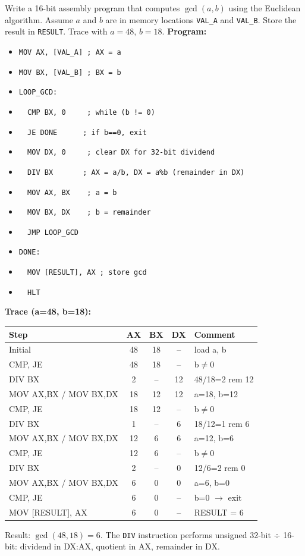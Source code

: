 \documentclass[11pt]{article}
\begin{document}
\begin{exoresolu}
Write a 16-bit assembly program that computes $\gcd(a,b)$ using the Euclidean algorithm. Assume $a$ and $b$ are in memory locations \texttt{VAL\_A} and \texttt{VAL\_B}. Store the result in \texttt{RESULT}. Trace with $a=48$, $b=18$.
\tcblower
\textbf{Program:}
\begin{itemize}
\item[] \texttt{MOV AX, [VAL\_A] ; AX = a}
\item[] \texttt{MOV BX, [VAL\_B] ; BX = b}
\item[] \texttt{LOOP\_GCD:}
\item[] \texttt{\ \ CMP BX, 0\ \ \ \ \ ; while (b != 0)}
\item[] \texttt{\ \ JE DONE\ \ \ \ \ \ ; if b==0, exit}
\item[] \texttt{\ \ MOV DX, 0\ \ \ \ \ ; clear DX for 32-bit dividend}
\item[] \texttt{\ \ DIV BX\ \ \ \ \ \ \ ; AX = a/b, DX = a\%b (remainder in DX)}
\item[] \texttt{\ \ MOV AX, BX\ \ \ \ ; a = b}
\item[] \texttt{\ \ MOV BX, DX\ \ \ \ ; b = remainder}
\item[] \texttt{\ \ JMP LOOP\_GCD}
\item[] \texttt{DONE:}
\item[] \texttt{\ \ MOV [RESULT], AX ; store gcd}
\item[] \texttt{\ \ HLT}
\end{itemize}
\textbf{Trace (a=48, b=18):}
\begin{center}
\begin{tabular}{|l|c|c|c|l|}
\hline
\rowcolor{popblueL} Step & AX & BX & DX & Comment \\ \hline
Initial & 48 & 18 & -- & load a, b \\ \hline
CMP, JE & 48 & 18 & -- & b$\neq$0 \\ \hline
DIV BX & 2 & -- & 12 & 48/18=2 rem 12 \\ \hline
MOV AX,BX / MOV BX,DX & 18 & 12 & 12 & a=18, b=12 \\ \hline
CMP, JE & 18 & 12 & -- & b$\neq$0 \\ \hline
DIV BX & 1 & -- & 6 & 18/12=1 rem 6 \\ \hline
MOV AX,BX / MOV BX,DX & 12 & 6 & 6 & a=12, b=6 \\ \hline
CMP, JE & 12 & 6 & -- & b$\neq$0 \\ \hline
DIV BX & 2 & -- & 0 & 12/6=2 rem 0 \\ \hline
MOV AX,BX / MOV BX,DX & 6 & 0 & 0 & a=6, b=0 \\ \hline
CMP, JE & 6 & 0 & -- & b=0 $\rightarrow$ exit \\ \hline
MOV [RESULT], AX & 6 & 0 & -- & RESULT = 6 \\ \hline
\end{tabular}
\end{center}
Result: $\gcd(48,18)=6$. The \texttt{DIV} instruction performs unsigned 32-bit $\div$ 16-bit: dividend in DX:AX, quotient in AX, remainder in DX.
\end{exoresolu}
\end{document}
